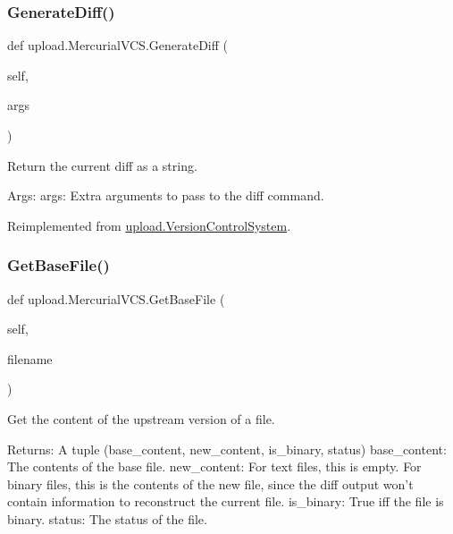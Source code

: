 \subsubsection{\texorpdfstring{GenerateDiff()}{GenerateDiff()}\hspace{0.1cm}{\footnotesize\ttfamily [2/2]}}
{\footnotesize\ttfamily def upload.\+Mercurial\+V\+C\+S.\+Generate\+Diff (\begin{DoxyParamCaption}\item[{}]{self,  }\item[{}]{args }\end{DoxyParamCaption})}

\begin{DoxyVerb}Return the current diff as a string.

Args:
  args: Extra arguments to pass to the diff command.
\end{DoxyVerb}
 

Reimplemented from \mbox{\hyperlink{classupload_1_1_version_control_system_aa5eb260c96e7016dab36b5fc136c9f49}{upload.\+Version\+Control\+System}}.

\mbox{\label{classupload_1_1_mercurial_v_c_s_a0cdc0cbe6ac4daab82f5f01e6ae2e670}} 
\subsubsection{\texorpdfstring{GetBaseFile()}{GetBaseFile()}\hspace{0.1cm}{\footnotesize\ttfamily [1/2]}}
{\footnotesize\ttfamily def upload.\+Mercurial\+V\+C\+S.\+Get\+Base\+File (\begin{DoxyParamCaption}\item[{}]{self,  }\item[{}]{filename }\end{DoxyParamCaption})}

\begin{DoxyVerb}Get the content of the upstream version of a file.

Returns:
  A tuple (base_content, new_content, is_binary, status)
base_content: The contents of the base file.
new_content: For text files, this is empty.  For binary files, this is
  the contents of the new file, since the diff output won't contain
  information to reconstruct the current file.
is_binary: True iff the file is binary.
status: The status of the file.
\end{DoxyVerb}
 

